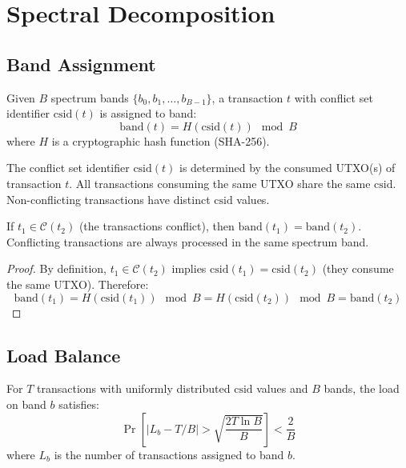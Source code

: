 \section{Spectral Decomposition}

\label{sec:partition}

\subsection{Band Assignment}

\begin{definition}
Given $B$ spectrum bands $\{b_0, b_1, \ldots, b_{B-1}\}$, a transaction $t$ with
conflict set identifier $\text{csid}(t)$ is assigned to band:
\[
\text{band}(t) = H(\text{csid}(t)) \mod B
\]
where $H$ is a cryptographic hash function (SHA-256).
\end{definition}

\begin{definition}
The conflict set identifier $\text{csid}(t)$ is determined by the consumed UTXO(s)
of transaction $t$. All transactions consuming the same UTXO share the same $\text{csid}$.
Non-conflicting transactions have distinct $\text{csid}$ values.
\end{definition}

\begin{theorem}
\label{thm:locality}
If $t_1 \in \mathcal{C}(t_2)$ (the transactions conflict), then $\text{band}(t_1) = \text{band}(t_2)$.
Conflicting transactions are always processed in the same spectrum band.
\end{theorem}

\begin{proof}
By definition, $t_1 \in \mathcal{C}(t_2)$ implies $\text{csid}(t_1) = \text{csid}(t_2)$
(they consume the same UTXO). Therefore:
\[
\text{band}(t_1) = H(\text{csid}(t_1)) \mod B = H(\text{csid}(t_2)) \mod B = \text{band}(t_2)
\]
\end{proof}

\subsection{Load Balance}

\begin{theorem}
\label{thm:balance}
For $T$ transactions with uniformly distributed $\text{csid}$ values and $B$ bands,
the load on band $b$ satisfies:
\[
\Pr\left[|L_b - T/B| > \sqrt{\frac{2T \ln B}{B}}\right] < \frac{2}{B}
\]
where $L_b$ is the number of transactions assigned to band $b$.
\end{theorem}

